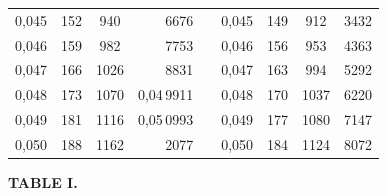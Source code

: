\begin{tabular}{|c|c|c|r|@{}p{9pt}@{}|c|c|c|r|}
0,045 & 152 & 940 & 6676 &  & 0,045 & 149 & 912 & 3432 \\[3pt]
0,046 & 159 & 982 & 7753 &  & 0,046 & 156 & 953 & 4363 \\
0,047 & 166 & 1026 & 8831 &  & 0,047 & 163 & 994 & 5292 \\
0,048 & 173 & 1070 & 0,04\,9911 &  & 0,048 & 170 & 1037 & 6220 \\
0,049 & 181 & 1116 & 0,05\,0993 &  & 0,049 & 177 & 1080 & 7147 \\
0,050 & 188 & 1162 & 2077 &  & 0,050 & 184 & 1124 & 8072 \\
\hline
\end{tabular}\par
\endgroup
\clearpage
{}
\begingroup
\centering
\fontsize{9}{9}\selectfont
\setlength{\tabcolsep}{6pt}
\renewcommand{\arraystretch}{1}
\setlength{\parskip}{0pt}
\textbf{TABLE I.}
\par\vspace{7pt}
